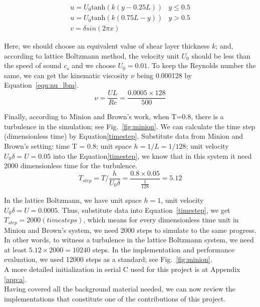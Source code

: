 \begin{equation}
\label{equ:init_u_lbm}
    \begin{matrix}
u = U_0\mathrm{tanh}(k (y-0.25L)) & y \leqslant 0.5 \\ 
u = U_0\mathrm{tanh}(k (0.75L-y)) & y > 0.5  \\
v = \delta sin(2\pi x )
\end{matrix}
\end{equation}

Here, we should choose an equivalent value of shear layer thickness $k$; and, according to lattice Boltzmann method, the velocity unit $U_0$ should be less than the speed of sound $c_s$ and we choose $U_0 = 0.01$. To keep the Reynolds number the same, we can get the kinematic viscosity $\nu$ being 0.000128 by Equation~\ref{equ:nu_lbm}.\\

\begin{equation}
    \label{equ:nu_lbm}
    \nu = \frac{UL}{Re} = \frac{0.0005 \times 128}{500}  
\end{equation}

Finally, according to Minion and Brown's work, when T=0.8, there is a turbulence in the simulation; see Fig.~\ref{fig:minion}. We can calculate the time step (dimensionless time) by Equation\ref{timestep}. Substitute data from Minion and Brown's setting: time T = 0.8;  unit space $h=1/L=1/128$; unit velocity $U_0 \delta=U=0.05$  into the Equation\ref{timestep}, we know that in this system it need 2000 dimensionless time for the turbulence.\\

\begin{equation}
\label{timestep}
    T_{step} = T / \frac{h}{U_0 \delta} = \frac{0.8 \times 0.05}{ \frac{1}{128}}= 5.12
\end{equation}

In the lattice Boltzmann, we have unit space $h=1$, unit velocity $U_0 \delta = U = 0.0005$. Thus, substitute data into Equation~\ref{timestep}, we get $T_{step} = 2000 (timesteps)$, which means for every dimensionless time unit in Minion and Brown's system, we need 2000 steps to simulate to the same progress. In other words, to witness a turbulence in the lattice Boltzmann system, we need at least $5.12 \times 2000 = 10240$ steps. In the implementation and performance evaluation, we used 12000 steps as a standard; see Fig.~\ref{fig:minion}.\\

A more detailed initialization in serial C used for this project is at Appendix \ref{app:a}.\\


\vspace*{+3.2cm}
Having covered all the background material needed, we can now review the implementations that constitute one of the contributions of this project.

